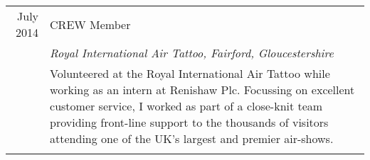 \documentclass[a4paper, 10pt]{extarticle} %
\begin{document}
\begin{tabular}{r | p{13cm}}
July 2014 

		&
		 
		 CREW Member  \\
		 
		 &
		 
		\textit{Royal International Air Tattoo, Fairford, Gloucestershire} \\ 
		
& 

\footnotesize{

Volunteered at the Royal International Air Tattoo while working as an intern at Renishaw Plc. Focussing on excellent customer service, I worked as part of a close-knit team providing front-line support to the thousands of visitors attending one of the UK's largest and premier air-shows. 

\vspace{-0.4cm}

} \vspace{-0.4cm} \\

\multicolumn{2}{c}{}

\end{tabular}



%
%

%
%
%
%
\end{document}
